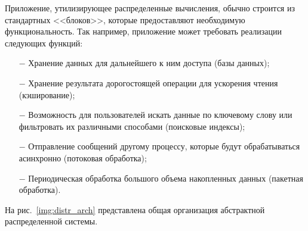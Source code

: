Приложение, утилизирующее распределенные вычисления, обычно строится из стандартных <<блоков>>, которые предоставляют необходимую функциональность.
Так например, приложение может требовать реализации следующих функций:
\begin{itemize}
  \item[$-$] Хранение данных для дальнейшего к ним доступа (базы данных);
  \item[$-$] Хранение результата дорогостоящей операции для ускорения чтения (кэширование);
  \item[$-$] Возможность для пользователей искать данные по ключевому слову или фильтровать их различными способами (поисковые индексы);
  \item[$-$] Отправление сообщений другому процессу, которые будут обрабатываться асинхронно (потоковая обработка);
  \item[$-$] Периодическая обработка большого объема накопленных данных (пакетная обработка).
\end{itemize}

На рис.~\ref{img:distr_arch} представлена общая организация абстрактной распределенной системы.



